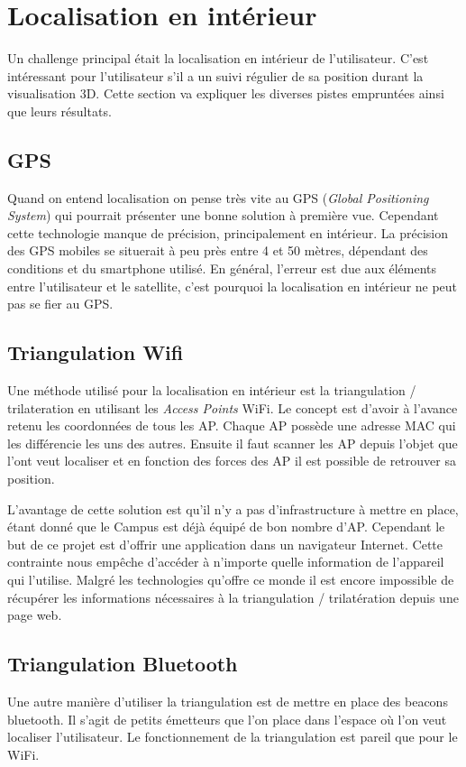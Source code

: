 \section{Localisation en intérieur}
Un challenge principal était la localisation en intérieur de l'utilisateur. C'est intéressant pour l'utilisateur s'il a un suivi régulier de sa position durant la visualisation 3D. Cette section va expliquer les diverses pistes empruntées ainsi que leurs résultats.

\subsection{GPS}
Quand on entend localisation on pense très vite au GPS (\textit{Global Positioning System}) qui pourrait présenter une bonne solution à première vue. Cependant cette technologie manque de précision, principalement en intérieur. La précision des GPS mobiles se situerait à peu près entre 4 et 50 mètres, dépendant des conditions et du smartphone utilisé. En général, l'erreur est due aux éléments entre l'utilisateur et le satellite, c'est pourquoi la localisation en intérieur ne peut pas se fier au GPS.

\subsection{Triangulation Wifi}
Une méthode utilisé pour la localisation en intérieur est la triangulation / trilateration en utilisant les \textit{Access Points} WiFi. Le concept est d'avoir à l'avance retenu les coordonnées de tous les AP. Chaque AP possède une adresse MAC qui les différencie les uns des autres. Ensuite il faut scanner les AP depuis l'objet que l'ont veut localiser et en fonction des forces des AP il est possible de retrouver sa position.

L'avantage de cette solution est qu'il n'y a pas d'infrastructure à mettre en place, étant donné que le Campus est déjà équipé de bon nombre d'AP. Cependant le but de ce projet est d'offrir une application dans un navigateur Internet. Cette contrainte nous empêche d'accéder à n'importe quelle information de l'appareil qui l'utilise. Malgré les technologies qu'offre ce monde il est encore impossible de récupérer les informations nécessaires à la triangulation / trilatération depuis une page web.

\subsection{Triangulation Bluetooth}
Une autre manière d'utiliser la triangulation est de mettre en place des beacons bluetooth. Il s'agit de petits émetteurs que l'on place dans l'espace où l'on veut localiser l'utilisateur. Le fonctionnement de la triangulation est pareil que pour le WiFi.



